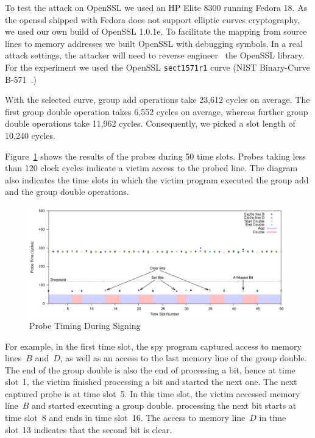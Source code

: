 \documentclass{llncs}
\begin{document}
To test the attack on OpenSSL we used an HP Elite 8300 
running Fedora 18.
As the openssl shipped with Fedora does not support elliptic curves cryptography,
we used our own build of OpenSSL 1.0.1e. 
To facilitate the mapping from source lines to memory addresses we built OpenSSL with debugging symbols.
In a real attack settings, the attacker will need to reverse engineer~\cite{cipsero10software}
the OpenSSL library.
For the experiment we used the OpenSSL \texttt{sect1571r1} curve (NIST Binary-Curve B-571~\cite{fips}.)

With the selected curve, group add operations take 23,612 cycles on average.
The first group double operation takes 6,552 cycles on average, whereas further group double operations take 11,962 cycles.
Consequently, we picked a slot length of 10,240 cycles.

Figure~\ref{dgm:timing} shows the results of the probes during 50 time slots.
Probes taking less than 120 clock cycles indicate a victim access to the probed line.
The diagram also indicates the time slots in which the victim program executed the group add and the group double operations.


\begin{figure}[htb]
\centering\includegraphics[width=\columnwidth]{images/timing}
\caption{Probe Timing During Signing\label{dgm:timing}}
\end{figure}

For example, in the first time slot, the spy program captured access to memory lines~$B$ and~$D$, as well as an access
to the last memory line of the group double.
The end of the group double is also the end of processing a bit, hence at time slot~1, the victim finished processing a bit
and started the next one.
The next captured probe is at time slot~5.
In this time slot, the victim accessed memory line~$B$ and started executing a group double.  
processing the next bit starts at time slot~8 and ends in time slot~16.
The access to memory line~$D$ in time slot~13 indicates that the second bit is clear.
\end{document}
